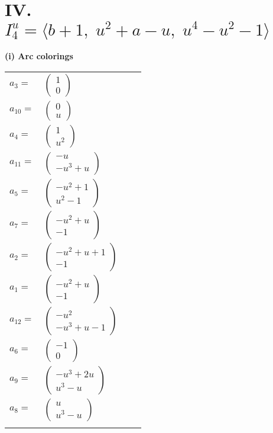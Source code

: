 \documentclass[1p]{elsarticle_modified}
\theoremstyle{definition}
\begin{document}
\centering \section*{IV. $I^u_{4}= \langle b+1,\;u^2+a- u,\;u^4- u^2-1 \rangle$}
\flushleft \textbf{(i) Arc colorings}\\
\begin{tabular}{m{7pt} m{180pt} m{7pt} m{180pt} }
\flushright $a_{3}=$&$\begin{pmatrix}1\\0\end{pmatrix}$ \\
\flushright $a_{10}=$&$\begin{pmatrix}0\\u\end{pmatrix}$ \\
\flushright $a_{4}=$&$\begin{pmatrix}1\\u^2\end{pmatrix}$ \\
\flushright $a_{11}=$&$\begin{pmatrix}- u\\- u^3+u\end{pmatrix}$ \\
\flushright $a_{5}=$&$\begin{pmatrix}- u^2+1\\u^2-1\end{pmatrix}$ \\
\flushright $a_{7}=$&$\begin{pmatrix}- u^2+u\\-1\end{pmatrix}$ \\
\flushright $a_{2}=$&$\begin{pmatrix}- u^2+u+1\\-1\end{pmatrix}$ \\
\flushright $a_{1}=$&$\begin{pmatrix}- u^2+u\\-1\end{pmatrix}$ \\
\flushright $a_{12}=$&$\begin{pmatrix}- u^2\\- u^3+u-1\end{pmatrix}$ \\
\flushright $a_{6}=$&$\begin{pmatrix}-1\\0\end{pmatrix}$ \\
\flushright $a_{9}=$&$\begin{pmatrix}- u^3+2 u\\u^3- u\end{pmatrix}$ \\
\flushright $a_{8}=$&$\begin{pmatrix}u\\u^3- u\end{pmatrix}$\\&\end{tabular}
\end{document}
